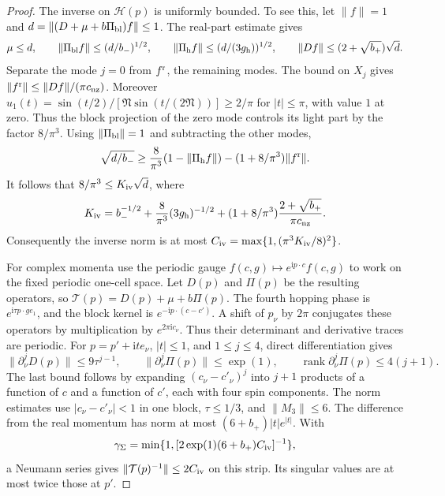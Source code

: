 \documentclass[11pt,letterpaper,reqno]{amsart}
\begin{document}
\begin{proof}
The inverse on $\mathcal H(p)$ is uniformly bounded.
To see this, let $\|f\|=1$ and
$d=\|(D+\mu+b\Pi_{\rm bl})f\|\le1$.
The real-part estimate gives
\[
 \mu\le d,\qquad
 \|\Pi_{\rm bl}f\|\le(d/b_-)^{1/2},\qquad
 \|\Pi_{\rm h}f\|\le(d/(3g_{\rm h}))^{1/2},
 \qquad \|Df\|\le(2+\sqrt{b_+})\sqrt d.
\]
Separate the mode $j=0$ from $f^{\rm r}$, the remaining
modes. The bound on $X_j$ gives
$\|f^{\rm r}\|\le\|Df\|/(\pi c_{\rm nz})$.
Moreover
$u_1(t)=\sin(t/2)/[\mathfrak N\sin(t/(2\mathfrak N))]
\ge2/\pi$ for $|t|\le\pi$, with value $1$ at zero.
Thus the block projection of the zero mode controls
its light part by the factor $8/\pi^3$.
Using $\|\Pi_{\rm bl}\|=1$ and subtracting the other modes,
\[
 \sqrt{d/b_-}\ge
 \frac8{\pi^3}(1-\|\Pi_{\rm h}f\|)
                     -(1+8/\pi^3)\|f^{\rm r}\|.
\]
It follows that $8/\pi^3\le K_{\rm iv}\sqrt d$, where
\[
 K_{\rm iv}=b_-^{-1/2}+\frac8{\pi^3}(3g_{\rm h})^{-1/2}
       +(1+8/\pi^3)\frac{2+\sqrt{b_+}}{\pi c_{\rm nz}}.
\]
Consequently the inverse norm is at most
$C_{\rm iv}=\max\{1,(\pi^3K_{\rm iv}/8)^2\}$.

For complex momenta use the periodic gauge
$f(c,g)\mapsto e^{\mathrm ip\cdot c}f(c,g)$ to work
on the fixed periodic one-cell space. Let $D(p)$
and $\Pi(p)$ be the resulting operators, so
$\mathcal T(p)=D(p)+\mu+b\Pi(p)$.
The fourth hopping phase is
$e^{\mathrm i\tau p\cdot ge_1}$, and the block kernel is
$e^{-\mathrm ip\cdot(c-c')}$. A shift of $p_\nu$
by $2\pi$ conjugates these operators by multiplication
by $e^{2\pi\mathrm ic_\nu}$.
Thus their determinant and derivative traces are periodic.
For $p=p'+\mathrm it e_\nu$, $|t|\le1$, and $1\le j\le4$,
direct differentiation gives
\begin{equation}\label{eq:term-Bloch-derivatives}
 \|\partial_\nu^jD(p)\|\le9\tau^{j-1},\qquad
 \|\partial_\nu^j\Pi(p)\|\le\exp(1),\qquad
 \operatorname{rank}\partial_\nu^j\Pi(p)\le4(j+1).
\end{equation}
The last bound follows by expanding $(c_\nu-c'_\nu)^j$
into $j+1$ products of a function of $c$ and a function
of $c'$, each with four spin components.
The norm estimates use $|c_\nu-c'_\nu|<1$ in one block,
$\tau\le1/3$, and $\|M_3\|\le6$.
The difference from the real momentum has norm at most
$(6+b_+)|t|e^{|t|}$. With
\[
 \gamma_\Sigma=
 \min\{1,[2\exp(1)(6+b_+)C_{\rm iv}]^{-1}\},
\]
a Neumann series gives
$\|\mathcal T(p)^{-1}\|\le2C_{\rm iv}$ on this strip.
Its singular values are at most twice those at $p'$.


\end{proof}
\end{document}
